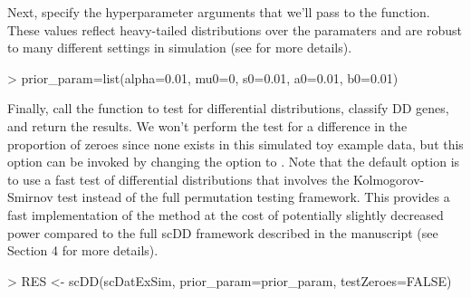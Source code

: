 \documentclass{article}
\begin{document}
Next, specify the hyperparameter arguments that we'll pass to the  function.  These values reflect heavy-tailed distributions over the paramaters and are robust to many different settings in simulation (see \cite{korthauer2015} for more details).
\begin{Schunk}
\begin{Sinput}
> prior_param=list(alpha=0.01, mu0=0, s0=0.01, a0=0.01, b0=0.01)
\end{Sinput}
\end{Schunk}
 
Finally, call the  function to test for differential distributions, classify DD genes, and return the results.  We won't perform the test for a difference in the proportion of zeroes since none exists in this simulated toy example data, but this option can be invoked by changing the  option to .  Note that the default option is to use a fast test of differential distributions that involves the Kolmogorov-Smirnov test instead of the full permutation testing framework.  This provides a fast implementation of the method at the cost of potentially slightly decreased power compared to the full scDD framework described in the manuscript (see Section 4 for more details).

\begin{Schunk}
\begin{Sinput}
> RES <- scDD(scDatExSim, prior_param=prior_param, testZeroes=FALSE)
\end{Sinput}
\end{Schunk}
\end{document}
